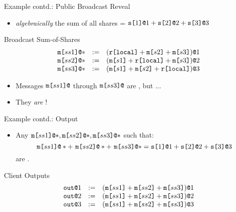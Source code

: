 \documentclass{beamer}
\begin{document}
\begin{frame}{Example contd.: Public Broadcast Reveal}

  \begin{itemize}
   \item \emph{algebraically} the sum of all shares = $\texttt{s[}1\texttt{]}\texttt{@}1 + \texttt{s[}2\texttt{]}\texttt{@}2 + \texttt{s[}3\texttt{]}\texttt{@}3$    
  \end{itemize}

  \begin{block}{Broadcast Sum-of-Shares}
    $$
    \begin{array}{lll}
      \texttt{m[}ss1\texttt{]}\texttt{@}* &:=& (\texttt{r[}\mathtt{local}\texttt{]} + \texttt{m[}s2\texttt{]} + \texttt{m[}s3\texttt{]})\texttt{@}1 \\ 
      \texttt{m[}ss2\texttt{]}\texttt{@}* &:=& (\texttt{m[}s1\texttt{]} + \texttt{r[}\mathtt{local}\texttt{]} + \texttt{m[}s3\texttt{]})\texttt{@}2 \\
      \texttt{m[}ss3\texttt{]}\texttt{@}* &:=& (\texttt{m[}s1\texttt{]} + \texttt{m[}s2\texttt{]} + \texttt{r[}\mathtt{local}\texttt{]})\texttt{@}3 
    \end{array}
    $$
  \end{block}

  \begin{itemize}
  \item Messages $\mx{ss1}$ through $\mx{ss3}$ are , but ...
  \item They \emph{are} !
  \end{itemize}
  
\end{frame}

\begin{frame}{Example contd.: Output}

  \begin{itemize}
    \item Any $\texttt{m[}ss1\texttt{]}\texttt{@}*,\texttt{m[}ss2\texttt{]}\texttt{@}*,\texttt{m[}ss3\texttt{]}\texttt{@}*$ such that:
    $$
    \mx{ss1}{*} + \ \mx{ss2}{*} + \ \mx{ss3}{*} = \sx{1}{1} + \sx{2}{2}  + \sx{3}{3}
    $$
    are .
  \end{itemize}

  \begin{block}{Client Outputs}
    $$
    \begin{array}{lll}
      \texttt{out}\texttt{@}1 &:=& (\texttt{m[}ss1\texttt{]} + \texttt{m[}ss2\texttt{]} + \texttt{m[}ss3\texttt{]})\texttt{@}1\\
      \texttt{out}\texttt{@}2 &:=& (\texttt{m[}ss1\texttt{]} + \texttt{m[}ss2\texttt{]} + \texttt{m[}ss3\texttt{]})\texttt{@}2\\
      \texttt{out}\texttt{@}3 &:=& (\texttt{m[}ss1\texttt{]} + \texttt{m[}ss2\texttt{]} + \texttt{m[}ss3\texttt{]})\texttt{@}3
    \end{array}
    $$
  \end{block}
  
  
\end{frame}
\end{document}
